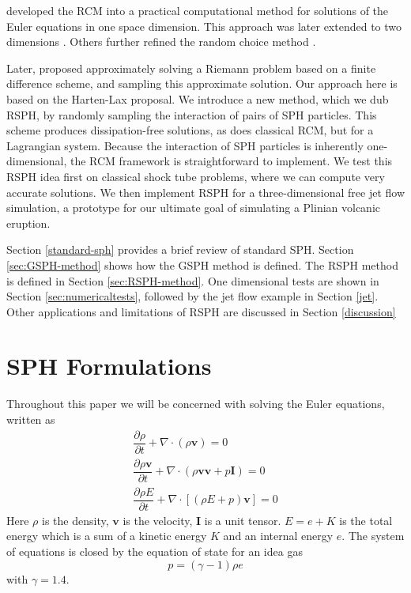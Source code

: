 \documentclass[preprint,12pt,authoryear]{elsarticle}
\begin{document}
\citet{chorin1976random} developed the RCM into a practical computational method for solutions of the Euler equations in one space dimension. This approach was later extended to two dimensions \cite{chorinporousmedium}. Others further refined the random choice method \citep{sod1977numerical,concus1979numerical,colella1982glimm, freistuhler1992numerical,toro2013riemann}. 

Later, \citet{hartenlax} proposed approximately solving a Riemann problem based on a finite difference scheme, and sampling this approximate solution. Our approach here is based on the Harten-Lax proposal. We introduce a new method, which we dub RSPH, by randomly sampling the interaction of pairs of SPH particles. This scheme produces dissipation-free solutions, as does classical RCM, but for a Lagrangian system. Because the interaction of SPH particles is inherently one-dimensional, the RCM framework is straightforward to implement. We test this RSPH idea first on classical shock tube problems, where we can compute very accurate solutions.
We then implement RSPH for a three-dimensional free jet flow simulation, a prototype for our ultimate goal of simulating a Plinian volcanic eruption.

Section \ref{standard-sph} provides a brief review of standard SPH. Section \ref{sec:GSPH-method} shows how the GSPH method is defined. The RSPH method is defined in Section \ref{sec:RSPH-method}.
One dimensional tests are shown in Section \ref{sec:numericaltests}, followed by the jet flow example in Section \ref{jet}. Other applications and limitations of RSPH are discussed in Section \ref{discussion}

\section{SPH Formulations} \label{sph}
Throughout this paper we will be concerned with solving the Euler equations, written as
\begin{align}
\dfrac{\partial \rho}{\partial t} + \nabla \cdot \left(\rho \textbf{v} \right) = 0 \label{eq:gov-cs-rho} \\
\dfrac{\partial \rho \textbf{v}}{\partial t} + \nabla \cdot \left(\rho \textbf{v} \textbf{v} + p\textbf{I}\right) = 0 \label{eq:gov-cs-v} \\
\dfrac{\partial \rho E}{\partial t} + \nabla \cdot \left[\left(\rho E + p \right)\textbf{v}\right] = 0 \label{eq:gov-cs-e}
\end{align}
Here $\rho$ is the density, $\textbf{v}$ is the velocity, $\textbf{I}$ is a unit tensor.
$E = e + K $ is the total energy which is a sum of a kinetic energy $K$ and an internal energy $e$.
The system of equations is closed by the equation of state for an idea gas
\begin{equation}
p = \left(\gamma - 1\right)\rho e \label{eq:EOS}
\end{equation}
with $\gamma=1.4$.
\end{document}
